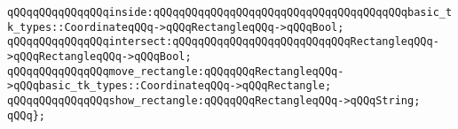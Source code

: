 \newline
\verb|qQQqqQQqqQQqqQQqinside:qQQqqQQqqQQqqQQqqQQqqQQqqQQqqQQqqQQqqQQqbasic_tk_types::CoordinateqQQq->qQQqRectangleqQQq->qQQqBool;|\newline
\verb|qQQqqQQqqQQqqQQqintersect:qQQqqQQqqQQqqQQqqQQqqQQqqQQqRectangleqQQq->qQQqRectangleqQQq->qQQqBool;|\newline
\verb|qQQqqQQqqQQqqQQqmove_rectangle:qQQqqQQqRectangleqQQq->qQQqbasic_tk_types::CoordinateqQQq->qQQqRectangle;|\newline
\verb|qQQqqQQqqQQqqQQqshow_rectangle:qQQqqQQqRectangleqQQq->qQQqString;|\newline
\newline
\verb|qQQq};|\newline

